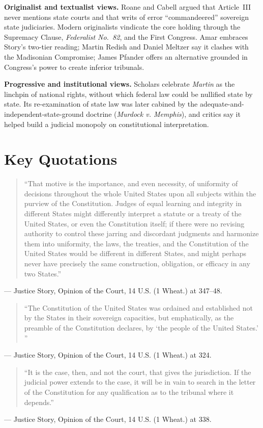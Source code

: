 \documentclass[12pt]{article}
\begin{document}
\textbf{Originalist and textualist views.} Roane and Cabell argued that Article~III never mentions state courts and that writs of error ``commandeered'' sovereign state judiciaries. Modern originalists vindicate the core holding through the Supremacy Clause, \textit{Federalist No.~82}, and the First Congress. Amar embraces Story's two-tier reading; Martin Redish and Daniel Meltzer say it clashes with the Madisonian Compromise; James Pfander offers an alternative grounded in Congress's power to create inferior tribunals.

\textbf{Progressive and institutional views.} Scholars celebrate \textit{Martin} as the linchpin of national rights, without which federal law could be nullified state by state. Its re-examination of state law was later cabined by the adequate-and-independent-state-ground doctrine (\textit{Murdock v. Memphis}), and critics say it helped build a judicial monopoly on constitutional interpretation.

\section{Key Quotations}

\begin{quote}
``That motive is the importance, and even necessity, of uniformity of decisions throughout the whole United States upon all subjects within the purview of the Constitution. Judges of equal learning and integrity in different States might differently interpret a statute or a treaty of the United States, or even the Constitution itself; if there were no revising authority to control these jarring and discordant judgments and harmonize them into uniformity, the laws, the treaties, and the Constitution of the United States would be different in different States, and might perhaps never have precisely the same construction, obligation, or efficacy in any two States.''
\end{quote}
\noindent --- Justice Story, Opinion of the Court, 14 U.S. (1 Wheat.) at 347--48.

\begin{quote}
``The Constitution of the United States was ordained and established not by the States in their sovereign capacities, but emphatically, as the preamble of the Constitution declares, by `the people of the United States.' ''
\end{quote}
\noindent --- Justice Story, Opinion of the Court, 14 U.S. (1 Wheat.) at 324.

\begin{quote}
``It is the case, then, and not the court, that gives the jurisdiction. If the judicial power extends to the case, it will be in vain to search in the letter of the Constitution for any qualification as to the tribunal where it depends.''
\end{quote}
\noindent --- Justice Story, Opinion of the Court, 14 U.S. (1 Wheat.) at 338.
\end{document}
